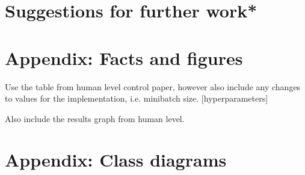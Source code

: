 \documentclass[10pt]{article}
\begin{document}
	\bigskip

\section{Suggestions for further work*}

\newpage
\printbibliography[
	    heading=bibintoc,
        title={References}
    ]
\newpage
\appendix

\section{Appendix: Facts and figures}
	Use the table from human level control paper, however also include any changes to values for the implementation, i.e. minibatch size. [hyperparameters]
	
	Also include the results graph from human level.

\section{Appendix: Class diagrams}
\end{document}
